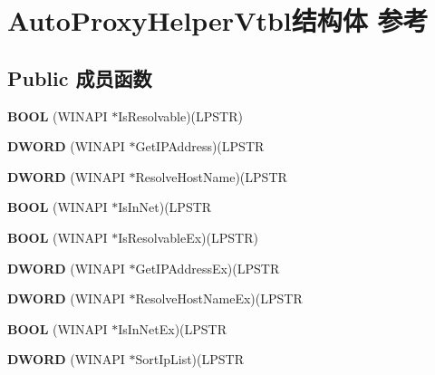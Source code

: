 \hypertarget{struct_auto_proxy_helper_vtbl}{}\section{Auto\+Proxy\+Helper\+Vtbl结构体 参考}
\label{struct_auto_proxy_helper_vtbl}
\subsection*{Public 成员函数}
\begin{DoxyCompactItemize}
\item 
\mbox{\label{struct_auto_proxy_helper_vtbl_a4a758c4574c77ea2a637428fd5ea4ecd}} 
{\bfseries B\+O\+OL} (W\+I\+N\+A\+PI $\ast$Is\+Resolvable)(L\+P\+S\+TR)
\item 
\mbox{\label{struct_auto_proxy_helper_vtbl_a6d42fec1aabbff45b5b04e6ce9e7f78a}} 
{\bfseries D\+W\+O\+RD} (W\+I\+N\+A\+PI $\ast$Get\+I\+P\+Address)(L\+P\+S\+TR
\item 
\mbox{\label{struct_auto_proxy_helper_vtbl_a263d937d46f78f16c936f40adc72f28a}} 
{\bfseries D\+W\+O\+RD} (W\+I\+N\+A\+PI $\ast$Resolve\+Host\+Name)(L\+P\+S\+TR
\item 
\mbox{\label{struct_auto_proxy_helper_vtbl_a06dca48002f8239e9ee8b0a87d3e74e7}} 
{\bfseries B\+O\+OL} (W\+I\+N\+A\+PI $\ast$Is\+In\+Net)(L\+P\+S\+TR
\item 
\mbox{\label{struct_auto_proxy_helper_vtbl_ad1a8ef4455e3463201c86d42e20c162e}} 
{\bfseries B\+O\+OL} (W\+I\+N\+A\+PI $\ast$Is\+Resolvable\+Ex)(L\+P\+S\+TR)
\item 
\mbox{\label{struct_auto_proxy_helper_vtbl_a075116d0ca0de549025b6fd257c79b98}} 
{\bfseries D\+W\+O\+RD} (W\+I\+N\+A\+PI $\ast$Get\+I\+P\+Address\+Ex)(L\+P\+S\+TR
\item 
\mbox{\label{struct_auto_proxy_helper_vtbl_a48c3d15b08e836a21fe3b5ad0ffd0a8c}} 
{\bfseries D\+W\+O\+RD} (W\+I\+N\+A\+PI $\ast$Resolve\+Host\+Name\+Ex)(L\+P\+S\+TR
\item 
\mbox{\label{struct_auto_proxy_helper_vtbl_a64f5b30564fdb980d408172e166fa30c}} 
{\bfseries B\+O\+OL} (W\+I\+N\+A\+PI $\ast$Is\+In\+Net\+Ex)(L\+P\+S\+TR
\item 
\mbox{\label{struct_auto_proxy_helper_vtbl_a2237c2d942498eed1a75bb9d621806b2}} 
{\bfseries D\+W\+O\+RD} (W\+I\+N\+A\+PI $\ast$Sort\+Ip\+List)(L\+P\+S\+TR
\end{DoxyCompactItemize}
